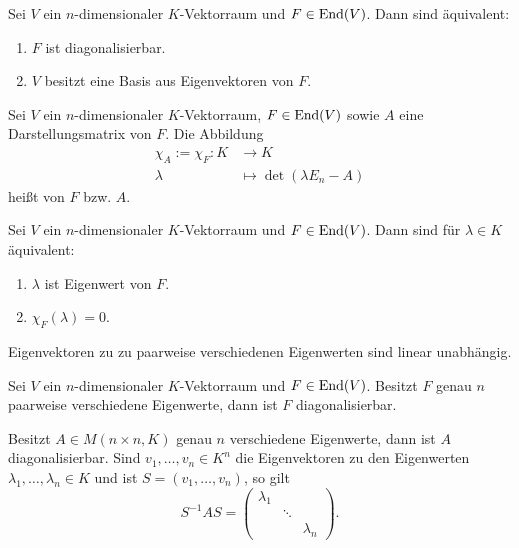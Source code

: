 \setcounter{definition}{8}
\begin{satz}
	\label{satz:I.16.9}
	Sei $V$ ein $n$-dimensionaler $K$-Vektorraum und $F \in \operatorname{End}(V)$.
	Dann sind äquivalent:
	\begin{enumerate}[(1)]
		\item $F$ ist diagonalisierbar.
		\item $V$ besitzt eine Basis aus Eigenvektoren von $F$.
	\end{enumerate}
\end{satz}
\newpage
\setcounter{definition}{10}
\begin{definition}
	\label{def:I.16.11}
	Sei $V$ ein $n$-dimensionaler $K$-Vektorraum, $F \in \operatorname{End}(V)$ sowie $A$ eine Darstellungsmatrix von $F$.
	Die Abbildung
	\begin{align*}
		\chi_A := \chi_F \colon K &\longrightarrow K \\
		\lambda &\longmapsto \det(\lambda E_n - A)
	\end{align*}
	heißt  von $F$ bzw. $A$.
\end{definition}

\begin{satz}
	\label{satz:I.16.12}
	Sei $V$ ein $n$-dimensionaler $K$-Vektorraum und $F \in \operatorname{End}(V)$.
	Dann sind für $\lambda \in K$ äquivalent:
	\begin{enumerate}[(1)]
		\item $\lambda$ ist Eigenwert von $F$.
		\item $\chi_F(\lambda) = 0$.
	\end{enumerate}
\end{satz}

\setcounter{definition}{13}
\begin{lemma}
	\label{def:I.16.14}
	Eigenvektoren zu zu paarweise verschiedenen Eigenwerten sind linear unabhängig.
\end{lemma}

\begin{satz}
	\label{satz:I.16.15}
	Sei $V$ ein $n$-dimensionaler $K$-Vektorraum und $F \in \operatorname{End}(V)$.
	Besitzt $F$ genau $n$ paarweise verschiedene Eigenwerte, dann ist $F$ diagonalisierbar.
\end{satz}

\begin{satz}
	\label{satz:I.16.16}
	Besitzt $A \in M(n \times n,K)$ genau $n$ verschiedene Eigenwerte, dann ist $A$ diagonalisierbar.
	Sind $v_1,\dots,v_n \in K^n$ die Eigenvektoren zu den Eigenwerten $\lambda_1,\dots,\lambda_n \in K$ und ist $S = (v_1,\dots,v_n)$, so gilt
	\[
		S^{-1}AS = \begin{pmatrix}
		\lambda_1 &  &  \\ 
		& \ddots &  \\ 
		&  & \lambda_n
		\end{pmatrix}.
	\]
\end{satz}

